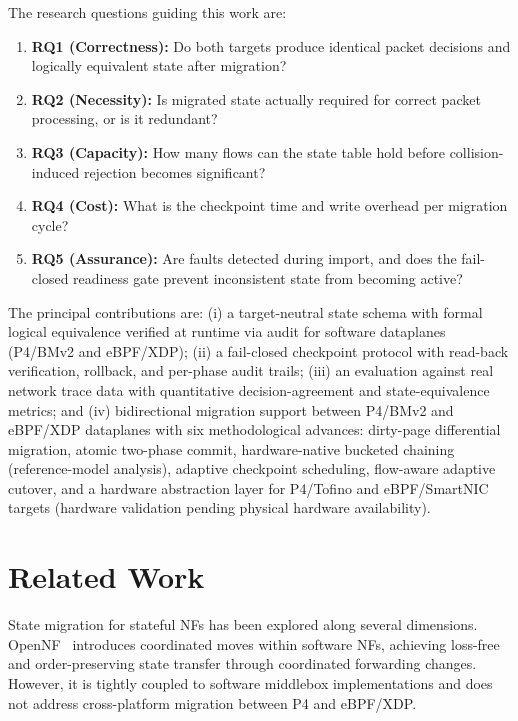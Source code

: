 \documentclass[10pt, conference]{IEEEtran}
\begin{document}
The research questions guiding this work are:

\begin{enumerate}
    \item \textbf{RQ1 (Correctness):} Do both targets produce identical packet decisions and logically equivalent state after migration?
    \item \textbf{RQ2 (Necessity):} Is migrated state actually required for correct packet processing, or is it redundant?
    \item \textbf{RQ3 (Capacity):} How many flows can the state table hold before collision-induced rejection becomes significant?
    \item \textbf{RQ4 (Cost):} What is the checkpoint time and write overhead per migration cycle?
    \item \textbf{RQ5 (Assurance):} Are faults detected during import, and does the fail-closed readiness gate prevent inconsistent state from becoming active?
\end{enumerate}

The principal contributions are: (i) a target-neutral state schema with formal logical equivalence verified at runtime via audit for software dataplanes (P4/BMv2 and eBPF/XDP); (ii) a fail-closed checkpoint protocol with read-back verification, rollback, and per-phase audit trails; (iii) an evaluation against real network trace data with quantitative decision-agreement and state-equivalence metrics; and (iv) bidirectional migration support between P4/BMv2 and eBPF/XDP dataplanes with six methodological advances: dirty-page differential migration, atomic two-phase commit, hardware-native bucketed chaining (reference-model analysis), adaptive checkpoint scheduling, flow-aware adaptive cutover, and a hardware abstraction layer for P4/Tofino and eBPF/SmartNIC targets (hardware validation pending physical hardware availability).

\section{Related Work}
\label{sec:related_work}

State migration for stateful NFs has been explored along several dimensions. OpenNF~\cite{gember2014opennf} introduces coordinated moves within software NFs, achieving loss-free and order-preserving state transfer through coordinated forwarding changes. However, it is tightly coupled to software middlebox implementations and does not address cross-platform migration between P4 and eBPF/XDP.
\end{document}
